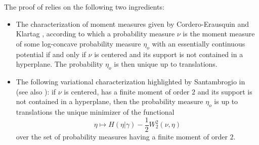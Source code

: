 \documentclass[10pt]{amsart}
\theoremstyle{definition}
\theoremstyle{remark}
\begin{document}
The proof of \cite[Theorem 1.3]{Gozlan21} relies on the following two ingredients:
\begin{itemize}
\item The characterization of moment measures given by Cordero-Erausquin and Klartag \cite{CEK15}, according to which a probability measure $\nu$ is the moment measure of some log-concave probability measure $\eta_o$ with an essentially continuous potential if and only if $\nu$ is centered and its support is not contained in a hyperplane. The probability $\eta_o$ is then unique up to translations.
\item The following variational characterization highlighted by Santambrogio in \cite{San16} (see also \cite{FGJ17}): if $\nu$ is centered, has a finite moment of order $2$ and its support is not contained in a hyperplane, then the probability measure $\eta_o$ is up to translations the unique minimizer of the functional 
\[
\eta \mapsto  H(\eta | \gamma)- \frac{1}{2}W_2^2(\nu,\eta)
\]
over the set of probability measures having a finite moment of order $2$.
\end{itemize}
\end{document}
